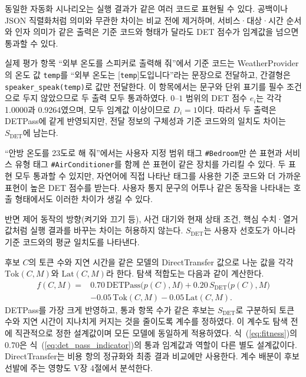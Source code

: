 \documentclass[10pt,twocolumn]{article}
\newcommand{\sdet}{\ensuremath{S_{\mathrm{DET}}}}
\newenvironment{revision}{\begingroup\color{revisionblue}}{\endgroup}
\begin{document}
\begin{revision}
동일한 자동화 시나리오는 실행 결과가 같은 여러 코드로 표현될 수 있다. 공백이나 JSON 직렬화처럼 의미와 무관한 차이는 비교 전에 제거하며, 서비스·대상·시간 순서와 인자 의미가 같은 출력은 기준 코드와 형태가 달라도 DET 점수가 임계값을 넘으면 통과할 수 있다.

실제 평가 항목 ``외부 온도를 스피커로 출력해 줘''에서 기준 코드는 WeatherProvider의 온도 값 \texttt{temp}를 ``외부 온도는 [\texttt{temp}]도입니다''라는 문장으로 전달하고, 간결형은 \texttt{speaker\_speak(temp)}로 값만 전달한다. 이 항목에서는 문구와 단위 표기를 필수 조건으로 두지 않았으므로 두 출력 모두 통과하였다. $0$--$1$ 범위의 DET 점수 $e_i$는 각각 1.0000과 0.9264였으며, 모두 임계값 이상이므로 $D_i=1$이다. 따라서 두 출력은 DETPass에 같게 반영되지만, 전달 정보의 구체성과 기준 코드와의 일치도 차이는 \sdet{}에 남는다.

``안방 온도를 23도로 해 줘''에서는 사용자 지정 범위 태그 \texttt{\#Bedroom}만 쓴 표현과 서비스 유형 태그 \texttt{\#AirConditioner}를 함께 쓴 표현이 같은 장치를 가리킬 수 있다. 두 표현 모두 통과할 수 있지만, 자연어에 직접 나타난 태그를 사용한 기준 코드와 더 가까운 표현이 높은 DET 점수를 받는다. 사용자 통지 문구의 어투나 같은 동작을 나타내는 호출 형태에서도 이러한 차이가 생길 수 있다.

반면 제어 동작의 방향(켜기와 끄기 등), 사건 대기와 현재 상태 조건, 핵심 수치·열거값처럼 실행 결과를 바꾸는 차이는 허용하지 않는다. \sdet{}는 사용자 선호도가 아니라 기준 코드와의 평균 일치도를 나타낸다.

후보 $C$의 토큰 수와 지연 시간을 같은 모델의 DirectTransfer 값으로 나눈 값을 각각 $\mathrm{Tok}(C,M)$와 $\mathrm{Lat}(C,M)$라 한다. 탐색 적합도는 다음과 같이 계산한다.
\begin{equation}
\begin{split}
f(C,M) = {} & 0.70\,\mathrm{DETPass}\bigl(p(C),M\bigr) + 0.20\,\sdet\bigl(p(C),M\bigr) \\
& - 0.05\,\mathrm{Tok}(C,M) - 0.05\,\mathrm{Lat}(C,M).
\end{split}
\label{eq:fitness}
\end{equation}
DETPass를 가장 크게 반영하고, 통과 항목 수가 같은 후보는 \sdet{}로 구분하되 토큰 수와 지연 시간이 지나치게 커지는 것을 줄이도록 계수를 정하였다. 이 계수도 탐색 전에 직관적으로 정한 설계값이며 모든 모델에 동일하게 적용하였다. 식~(\ref{eq:fitness})의 0.70은 식~(\ref{eq:det_pass_indicator})의 통과 임계값과 역할이 다른 별도 설계값이다. DirectTransfer는 비용 항의 정규화와 최종 결과 비교에만 사용한다. 계수 배분이 후보 선발에 주는 영향도 V장 4절에서 분석한다.
\end{revision}
\end{document}
